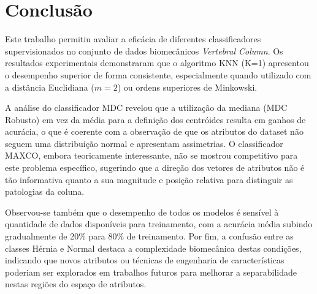 \section{Conclusão}
\label{chap:conclusao}

Este trabalho permitiu avaliar a eficácia de diferentes classificadores supervisionados no conjunto de dados biomecânicos \textit{Vertebral Column}. Os resultados experimentais demonstraram que o algoritmo KNN (K=1) apresentou o desempenho superior de forma consistente, especialmente quando utilizado com a distância Euclidiana ($m=2$) ou ordens superiores de Minkowski.

A análise do classificador MDC revelou que a utilização da mediana (MDC Robusto) em vez da média para a definição dos centróides resulta em ganhos de acurácia, o que é coerente com a observação de que os atributos do dataset não seguem uma distribuição normal e apresentam assimetrias. O classificador MAXCO, embora teoricamente interessante, não se mostrou competitivo para este problema específico, sugerindo que a direção dos vetores de atributos não é tão informativa quanto a sua magnitude e posição relativa para distinguir as patologias da coluna.

Observou-se também que o desempenho de todos os modelos é sensível à quantidade de dados disponíveis para treinamento, com a acurácia média subindo gradualmente de 20\% para 80\% de treinamento. Por fim, a confusão entre as classes Hérnia e Normal destaca a complexidade biomecânica destas condições, indicando que novos atributos ou técnicas de engenharia de características poderiam ser explorados em trabalhos futuros para melhorar a separabilidade nestas regiões do espaço de atributos.
